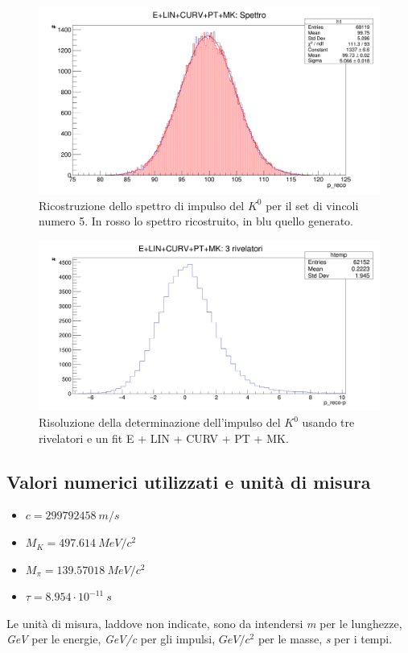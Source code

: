 \documentclass[8pt]{extarticle}
\begin{document}
\begin{figure}
	\begin{center}
		\includegraphics[scale=0.25]{set_5_spettro} 
		\caption{Ricostruzione dello spettro di impulso del $K^0$ per il set di vincoli numero 5. In rosso lo spettro ricostruito, in blu quello generato.}
		\label{fig:set_5_spettro}
	\end{center}
\end{figure}

\begin{figure}
	\begin{center}
		\includegraphics[scale=0.25]{set_1det_p} 
		\caption{Risoluzione della determinazione dell'impulso del $K^0$ usando tre rivelatori e un fit E + LIN + CURV + PT + MK.}
		\label{fig:set_1det_p}
	\end{center}
\end{figure}




\subsection{Valori numerici utilizzati e unità di misura}
\begin{itemize}
\item $c = 299792458\ m/s$
\item $M_K = 497.614\ MeV/c^2$
\item $M_\pi = 139.57018\ MeV/c^2$
\item $\tau = 8.954\cdot 10^{-11}\ s$
\end{itemize}

Le unità di misura, laddove non indicate, sono da intendersi \textit{m} per le lunghezze, \textit{GeV} per le energie, \textit{GeV/c} per gli impulsi, \textit{$GeV/c^2$} per le masse, \textit{s} per i tempi.
\end{document}
